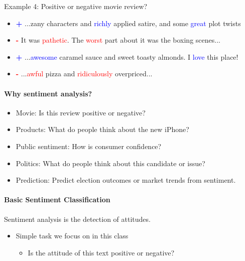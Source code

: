 \documentclass{book}
\begin{document}
Example 4: Positive or negative movie review?
    \begin{itemize}
     \item  \textcolor{blue}{\textbf{+}}   ...zany characters and \textcolor{blue}{richly} applied satire, and some \textcolor{blue}{great} plot twists 
     \item   \textcolor{red}{\textbf{-}} It was \textcolor{red}{pathetic}. The \textcolor{red}{worst} part about it was the boxing scenes... 
    \item   \textcolor{blue}{\textbf{+}}  ...\textcolor{blue}{awesome} caramel sauce and sweet toasty almonds. I \textcolor{blue}{love} this place! \\
     \item \textcolor{red}{\textbf{-}} ...\textcolor{red}{awful} pizza and \textcolor{red}{ridiculously} overpriced... 
    \end{itemize}



\paragraph{Why sentiment analysis?}
    \begin{itemize}
        \item Movie: Is this review positive or negative?
        \item Products: What do people think about the new iPhone?
        \item Public sentiment: How is consumer confidence?
        \item Politics: What do people think about this candidate or issue?
        \item Prediction: Predict election outcomes or market trends from sentiment.
    \end{itemize}


\paragraph{Basic Sentiment Classification}
    Sentiment analysis is the detection of attitudes.
    \begin{itemize}
        \item Simple task we focus on in this class
        \begin{itemize}
            \item Is the attitude of this text positive or negative?
        \end{itemize}
    \end{itemize}
\end{document}
